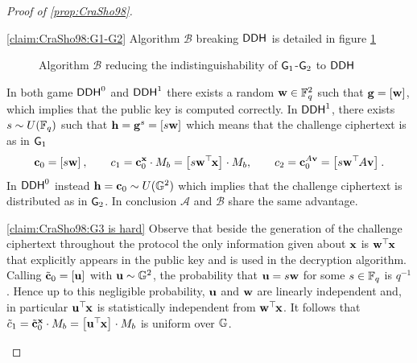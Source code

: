 \begin{proof}[Proof of \ref{prop:CraSho98}]
\begin{claimproof}{\ref{claim:CraSho98:G1-G2}}
	Algorithm $\mathcal{B}$ breaking $\ddh$ is detailed in figure \ref{prot:CraSho98:DDH_reduction}
\begin{figure}[htb]
\centering
{}
\label{prot:CraSho98:DDH_reduction}
\caption{Algorithm $\mathcal{B}$ reducing the indistinguishability of $\cd{G}_1$-$\cd{G}_2$ to $\ddh$}
\end{figure}

	In both game $\ddh[0]$ and $\ddh[1]$ there exists a random $\vc{w} \in \F_q^2$ such that $\vc{g} = \gexp{}{\vc{w}}$, which implies that the public key is computed correctly. In $\ddh[1]$, there exists $s \sim U(\F_q)$ such that $\vc{h} = \vc{g}^s = \gexp{}{s \vc{w}}$ which means that the challenge ciphertext is as in $\cd{G}_1$
	\[
		\vc{c}_0 = \gexp{}{s \vc{w}}
			, \qquad
		c_1 = \vc{c}_0^\vc{x} \cdot M_b = \gexp{}{s \vc{w}^\trs \vc{x}} \cdot M_b
			, \qquad
		c_2 = \vc{c}_0^{A \vc{v}} = \gexp{}{s \vc{w}^\trs A \vc{v}}.
	\]
	In $\ddh[0]$ instead $\vc{h} = \vc{c}_0 \sim U(\G^2)$ which implies that the challenge ciphertext is distributed as in $\cd{G}_2$. In conclusion $\mathcal{A}$ and $\mathcal{B}$ share the same advantage.
\end{claimproof}

\begin{claimproof}{\ref{claim:CraSho98:G3 is hard}}
	Observe that beside the generation of the challenge ciphertext throughout the protocol the only information given about $\vc{x}$ is $\vc{w}^\trs \vc{x}$ that explicitly appears in the public key and is used in the decryption algorithm.\\
	Calling $\tilde{\vc{c}}_0 = \gexp{}{\vc{u}}$ with $\vc{u} \sim \G^2$, the probability that $\vc{u} = s \vc{w}$ for some $s \in \F_q$ is $q^{-1}$.
	Hence up to this negligible probability, $\vc{u}$ and $\vc{w}$ are linearly independent and, in particular $\vc{u}^\trs \vc{x}$ is statistically independent from $\vc{w}^\trs \vc{x}$. 
	It follows that $\tilde{c}_1 = \tilde{\vc{c}}_0^{\vc{x}} \cdot M_b = \gexp{}{\vc{u}^\trs \vc{x}} \cdot M_b$ is uniform over $\G$.
\end{claimproof}


\end{proof}
